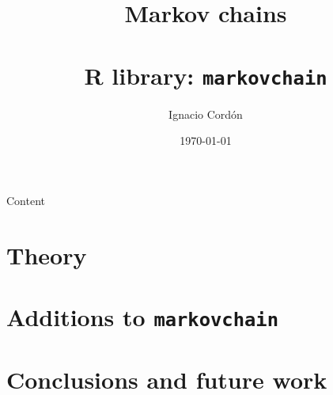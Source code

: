 \documentclass[english,9pt, notheorems, xcolor=dvipsnames]{beamer}
\title{Markov chains\\ ~\\R library: \texttt{markovchain}}
\author{Ignacio Cordón}
\date{\today}
\begin{document}
 \setcounter{showProgressBar}{0}
 \setcounter{showSlideNumbers}{0}

 \frame{\titlepage}
 
  \begin{frame}{Content}
  \tableofcontents
 \end{frame}

 \setcounter{framenumber}{0}
 \setcounter{showProgressBar}{1}
 \setcounter{showSlideNumbers}{1}
 
  
  

 \section{Theory}
  
  
  
  
  
  
  
 \section{Additions to \texttt{markovchain}}
  
  
  
  
  
  
  
  
  
 \section{Conclusions and future work}
 
 
 
\end{document}
